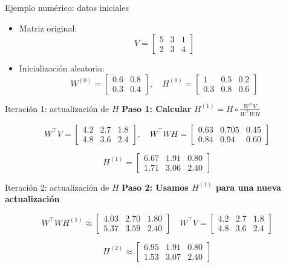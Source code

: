 \documentclass{beamer}
\begin{document}
\begin{frame}{Ejemplo numérico: datos iniciales}
\begin{itemize}
    \item Matriz original:
    \[
        V = \begin{bmatrix}
            5 & 3 & 1 \\
            2 & 3 & 4
        \end{bmatrix}
    \]
    \item Inicialización aleatoria:
    \[
        W^{(0)} = \begin{bmatrix}
            0.6 & 0.8 \\
            0.3 & 0.4
        \end{bmatrix}, \quad
        H^{(0)} = \begin{bmatrix}
            1 & 0.5 & 0.2 \\
            0.3 & 0.8 & 0.6
        \end{bmatrix}
    \]
\end{itemize}
\end{frame}

\begin{frame}{Iteración 1: actualización de $ H $}
\textbf{Paso 1: Calcular} $ H^{(1)} = H \circ \frac{W^\top V}{W^\top WH} $

\[
W^\top V =
\begin{bmatrix}
4.2 & 2.7 & 1.8 \\
4.8 & 3.6 & 2.4
\end{bmatrix}, \quad
W^\top W H =
\begin{bmatrix}
0.63 & 0.705 & 0.45 \\
0.84 & 0.94 & 0.60
\end{bmatrix}
\]

\[
H^{(1)} =
\begin{bmatrix}
6.67 & 1.91 & 0.80 \\
1.71 & 3.06 & 2.40
\end{bmatrix}
\]
\end{frame}

\begin{frame}{Iteración 2: actualización de $ H $}
\textbf{Paso 2: Usamos $ H^{(1)} $ para una nueva actualización}

\[
W^\top W H^{(1)} \approx
\begin{bmatrix}
4.03 & 2.70 & 1.80 \\
5.37 & 3.59 & 2.40
\end{bmatrix}
\quad
W^\top V =
\begin{bmatrix}
4.2 & 2.7 & 1.8 \\
4.8 & 3.6 & 2.4
\end{bmatrix}
\]

\[
H^{(2)} \approx
\begin{bmatrix}
6.95 & 1.91 & 0.80 \\
1.53 & 3.07 & 2.40
\end{bmatrix}
\]
\end{frame}
\end{document}
